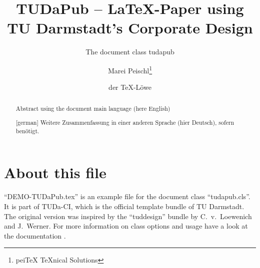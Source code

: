 \documentclass[
	english,%
	accentcolor=9c,%
]{tudapub}
\title{TUDaPub -- \LaTeX-Paper using TU Darmstadt's Corporate Design}
\subtitle{The document class tudapub}
\author{Marei Peischl\thanks{pei\TeX{} \TeX{}nical Solutions}\and der \TeX-Löwe}
\begin{document}
\maketitle

\begin{abstract}
	Abstract using the document main language (here English)
\end{abstract}

\begin{abstract}[german]
	Weitere Zusammenfassung in einer anderen Sprache (hier Deutsch), sofern benötigt.
\end{abstract}

\tableofcontents


\section{About this file}

\enquote{DEMO-TUDaPub.tex} is an example file for the document class \enquote{tudapub.cls}.
It is part of TUDa-CI, which is the official template bundle of TU Darmstadt. The original version was inspired by the \enquote{tuddesign} bundle by C.~v.~Loewenich and J.~Werner.
For more information on class options and usage have a look at the documentation \cite{tuda-ci}.


\printbibliography
\end{document}
